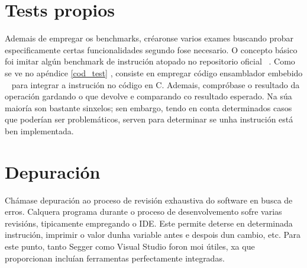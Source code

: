 \section{Tests propios}\label{sec:tests}
Ademais de empregar os benchmarks, créaronse varios exames buscando probar especificamente certas funcionalidades segundo fose necesario. O concepto básico foi imitar algún benchmark de instrución atopado no repositorio oficial ~\cite{riscv_tests}. Como se ve no apéndice \ref{cod_test} , consiste en empregar código ensamblador embebido ~\cite{asm_emb} para integrar a instrución no código en C. Ademais, compróbase o resultado da operación gardando o que devolve e comparando co resultado esperado. Na súa maioría son bastante sinxelos; sen embargo, tendo en conta determinados casos que poderían ser problemáticos, serven para determinar se unha instrución está ben implementada.


\section{Depuración}\label{sec:depuración}
Chámase depuración ao proceso de revisión exhaustiva do software en busca de erros. Calquera programa durante o proceso de desenvolvemento sofre varias revisións, tipicamente empregando o IDE. Este permite deterse en determinada instrución, imprimir o valor dunha variable antes e despois dun cambio, etc. Para este punto, tanto Segger como Visual Studio foron moi útiles, xa que proporcionan incluían ferramentas perfectamente integradas.

